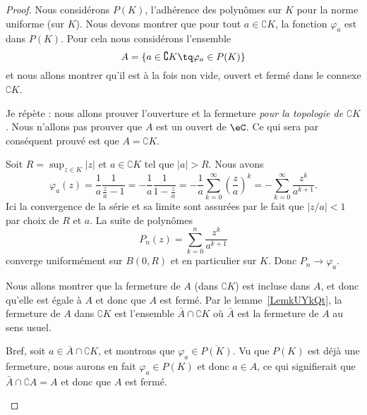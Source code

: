\begin{proof}
	Nous considérons \( P(K)\), l'adhérence des polynômes sur \( K\) pour la norme uniforme (sur \( K\)). Nous devons montrer que pour tout \( a\in \complement K\), la fonction \( \varphi_a\) est dans \( P(K)\). Pour cela nous considérons l'ensemble
	\begin{equation}
		A=\{ a\in\complement K\tq \varphi_a\in P(K) \}
	\end{equation}
	et nous allons montrer qu'il est à la fois non vide, ouvert et fermé dans le connexe \( \complement K\).

	Je répète : nous allons prouver l'ouverture et la fermeture \emph{pour la topologie de \( \complement K\)}. Nous n'allons pas prouver que \( A\) est un ouvert de \( \eC\). Ce qui sera par conséquent prouvé est que \( A=\complement K\).

	\begin{subproof}
		 Soit \( R=\sup_{z\in K}| z |\) et \( a\in \complement K\) tel que \( | a |>R\). Nous avons
		\begin{equation}
			\varphi_a(z)=\frac{1}{ a }\frac{1}{ \frac{ z }{ a }-1 }
			=-\frac{1}{ a }\frac{1}{ 1-\frac{ z }{ a } }
			=-\frac{1}{ a }\sum_{k=0}^{\infty}\left( \frac{ z }{ a } \right)^k
			=-\sum_{k=0}^{\infty}\frac{ z^k }{ a^{k+1} }.
		\end{equation}
		Ici la convergence de la série et sa limite sont assurées par le fait que \( | z/a |<1\) par choix de \( R\) et \( a\). La suite de polynômes
		\begin{equation}
			P_n(z)=\sum_{k=0}^n\frac{ z^k }{ a^{k+1} }
		\end{equation}
		converge uniformément sur \( B(0,R)\) et en particulier sur \( K\). Donc \( P_n\to \varphi_a\).

		\spitem[Fermé]

		Nous allons montrer que la fermeture de \( A\) (dans \( \complement K\)) est incluse dans \( A\), et donc qu'elle est égale à \( A\) et donc que \( A\) est fermé. Par le lemme~\ref{LemkUYkQt}, la fermeture de \( A\) dans \( \complement K\) est l'ensemble \( \bar A\cap\complement K\) où \( \bar A\) est la fermeture de \( A\) au sens usuel.

		Bref, soit \( a\in \bar A\cap\complement K\), et montrons que \( \varphi_a\in \overline{ P(K) }\). Vu que \( P(K)\) est déjà une fermeture, nous aurons en fait \( \varphi_a\in P(K)\) et donc \( a\in A\), ce qui signifierait que \( \bar A\cap\complement A=A\) et donc que \( A\) est fermé.


\end{subproof}
\end{proof}
